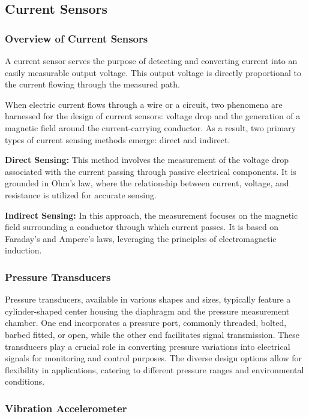 \subsection{Current Sensors}

\subsubsection{Overview of Current Sensors}

A current sensor serves the purpose of detecting and converting current into an easily measurable output voltage. This output voltage is directly proportional to the current flowing through the measured path.

When electric current flows through a wire or a circuit, two phenomena are harnessed for the design of current sensors: voltage drop and the generation of a magnetic field around the current-carrying conductor. As a result, two primary types of current sensing methods emerge: direct and indirect.

\textbf{Direct Sensing:} This method involves the measurement of the voltage drop associated with the current passing through passive electrical components. It is grounded in Ohm's law, where the relationship between current, voltage, and resistance is utilized for accurate sensing.

\textbf{Indirect Sensing:} In this approach, the measurement focuses on the magnetic field surrounding a conductor through which current passes. It is based on Faraday's and Ampere's laws, leveraging the principles of electromagnetic induction.

\subsubsection{Pressure Transducers}

Pressure transducers, available in various shapes and sizes, typically feature a cylinder-shaped center housing the diaphragm and the pressure measurement chamber. One end incorporates a pressure port, commonly threaded, bolted, barbed fitted, or open, while the other end facilitates signal transmission. These transducers play a crucial role in converting pressure variations into electrical signals for monitoring and control purposes. The diverse design options allow for flexibility in applications, catering to different pressure ranges and environmental conditions.


\subsubsection{Vibration Accelerometer}

